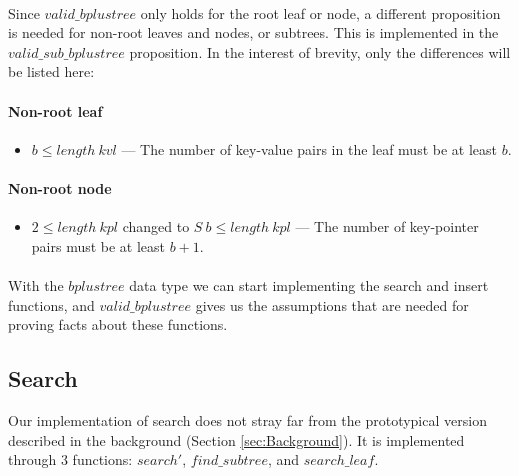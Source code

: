 \paragraph{}
Since $valid\_bplustree$ only holds for the root leaf or node, a different proposition is needed for non-root leaves and nodes, or subtrees. This is implemented in the $valid\_sub\_bplustree$ proposition. In the interest of brevity, only the differences will be listed here:

\paragraph{Non-root leaf}
\begin{itemize}
\item $b \leq length\ kvl$ --- The number of key-value pairs in the leaf must be at least $b$.
\end{itemize}

\paragraph{Non-root node}
\begin{itemize}
\item $2 \leq length\ kpl$ changed to $S\ b \leq length\ kpl$ --- The number of key-pointer pairs must be at least $b+1$.
\end{itemize}

\paragraph{}
With the $bplustree$ data type we can start implementing the search and insert functions, and $valid\_bplustree$ gives us the assumptions that are needed for proving facts about these functions.

\subsection{Search}
\label{subsec:search}
Our implementation of search does not stray far from the prototypical version described in the background (Section \ref{sec:Background}). It is implemented through 3 functions: $search'$, $find\_subtree$, and $search\_leaf$. 

